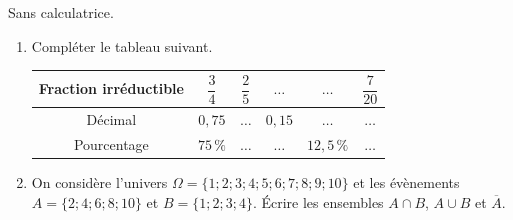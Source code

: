 \documentclass[10pt,a4paper]{article}
\begin{document}
\begin{bloc}
\begin{exo}
Sans calculatrice.
\begin{enumerate}[leftmargin=*]
    \item Compléter le tableau suivant.

    \begin{center}
    \renewcommand{\arraystretch}{1.8}
    \begin{tabular}{|c|c|c|c|c|c|}
        \hline
        Fraction irréductible & \(\dfrac{3}{4}\) & \(\dfrac{2}{5}\) & \(\dots\) & \(\dots\) & \(\dfrac{7}{20}\) \\ \hline
        Décimal & \(0,75\) & \(\dots\) & \(0,15\) & \(\dots\) & \(\dots\) \\ \hline
        Pourcentage & \(75\,\%\) & \(\dots\) & \(\dots\) & \(12,5\,\%\) & \(\dots\) \\ \hline
    \end{tabular}
    \end{center}
    \item On considère l'univers \(\Omega=\{1;2;3;4;5;6;7;8;9;10\}\) et les évènements \(A=\{2;4;6;8;10\}\) et \(B=\{1;2;3;4\}\). Écrire les ensembles \(A\cap B\), \(A\cup B\) et \(\overline{A}\).
\end{enumerate}
\end{exo}
\end{bloc}
\end{document}
